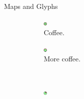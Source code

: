 \documentclass{beamer}
\begin{document}
  \begin{frame}{Maps and Glyphs}
  \begin{figure}[!b]
    \centering
      \begin{subfigure}[b]{0.45\linewidth}
         \centering
	 \includegraphics[width=0.5\linewidth]{assets/symbol_nested_circles}
	 \caption{Coffee.}
      \end{subfigure}
      \begin{subfigure}[b]{0.45\linewidth}
         \centering
	 \includegraphics[width=0.5\linewidth]{assets/symbol_nested_elastic_circles}
	 \caption{More coffee.}
      \end{subfigure}\\
      \begin{subfigure}[b]{0.45\linewidth}
         \centering
	 \includegraphics[width=0.5\linewidth]{assets/symbol_pie}

\end{subfigure}
\end{figure}
\end{frame}
\end{document}

